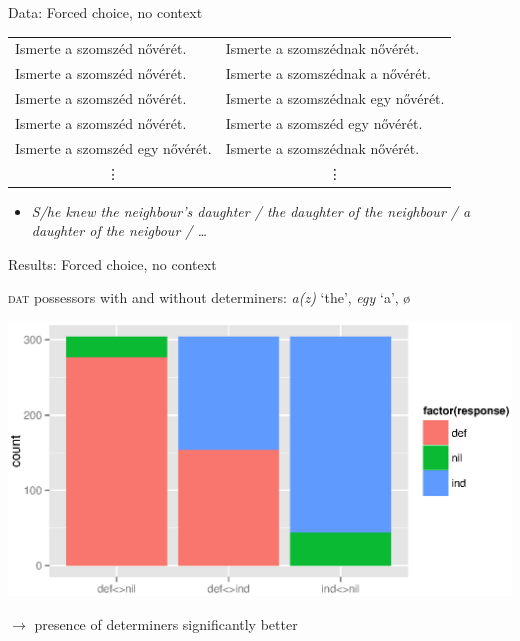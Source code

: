 \documentclass[12pt]{beamer}
\begin{document}
\begin{frame}{Data: Forced choice, no context}

\begin{tabulary}{1\linewidth}{ll}
Ismerte a szomszéd nővérét.        & Ismerte a szomszédnak nővérét.\\
Ismerte a szomszéd nővérét.        & Ismerte a szomszédnak \textcolor{red!70!black}{a} nővérét.\\
Ismerte a szomszéd nővérét.        & Ismerte a szomszédnak \alert{egy} nővérét.\\
Ismerte a szomszéd nővérét.        & Ismerte a szomszéd \alert{egy} nővérét.\\
Ismerte a szomszéd \alert{egy} nővérét.    & Ismerte a szomszédnak nővérét.\\
 & \\
\end{tabulary}

\begin{itemize}
    \item \emph{S/he knew the neighbour's daughter / \textcolor{red!70!black}{the} daughter of the neighbour / \alert{a} daughter of the neigbour / \dots}
\end{itemize}

\end{frame}

\begin{frame}{Results: Forced choice, no context}

    \textsc{dat} possessors with and without determiners: \emph{a(z)} `the', \emph{egy} `a', ø

    \includegraphics[width=1.0\linewidth]{NoContextFC.eps}

    $\to$ presence of determiners significantly better

\end{frame}
\end{document}
